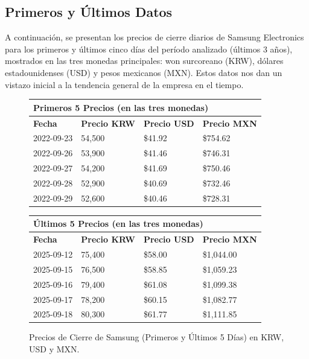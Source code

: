 \documentclass[12pt, a4paper]{article}
\begin{document}
\subsection*{Primeros y Últimos Datos}
A continuación, se presentan los precios de cierre diarios de Samsung Electronics para los primeros y últimos cinco días del período analizado (últimos 3 años), mostrados en las tres monedas principales: won surcoreano (KRW), dólares estadounidenses (USD) y pesos mexicanos (MXN). Estos datos nos dan un vistazo inicial a la tendencia general de la empresa en el tiempo.

\begin{figure}[H]
    \centering
    \begin{tabularx}{\textwidth}{@{}llll@{}}
        \toprule
        \multicolumn{4}{l}{\textbf{Primeros 5 Precios (en las tres monedas)}} \\
        \midrule
        \textbf{Fecha} & \textbf{Precio KRW} & \textbf{Precio USD} & \textbf{Precio MXN} \\
        \midrule
        2022-09-23 & 54,500 & \$41.92 & \$754.62 \\
        2022-09-26 & 53,900 & \$41.46 & \$746.31 \\
        2022-09-27 & 54,200 & \$41.69 & \$750.46 \\
        2022-09-28 & 52,900 & \$40.69 & \$732.46 \\
        2022-09-29 & 52,600 & \$40.46 & \$728.31 \\
        \bottomrule
    \end{tabularx}
    \par\vspace{1em}
    \begin{tabularx}{\textwidth}{@{}llll@{}}
        \toprule
        \multicolumn{4}{l}{\textbf{Últimos 5 Precios (en las tres monedas)}} \\
        \midrule
        \textbf{Fecha} & \textbf{Precio KRW} & \textbf{Precio USD} & \textbf{Precio MXN} \\
        \midrule
        2025-09-12 & 75,400 & \$58.00 & \$1,044.00 \\
        2025-09-15 & 76,500 & \$58.85 & \$1,059.23 \\
        2025-09-16 & 79,400 & \$61.08 & \$1,099.38 \\
        2025-09-17 & 78,200 & \$60.15 & \$1,082.77 \\
        2025-09-18 & 80,300 & \$61.77 & \$1,111.85 \\
        \bottomrule
    \end{tabularx}
    \caption{Precios de Cierre de Samsung (Primeros y Últimos 5 Días) en KRW, USD y MXN.}
    \label{tab:precios_cierre}
\end{figure}
\end{document}

